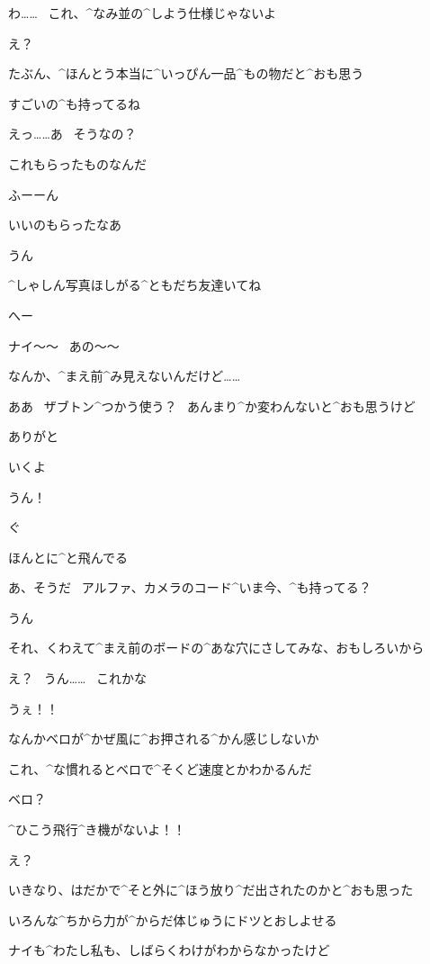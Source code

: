 \Nai わ……
\ これ、^{なみ}{並}の^{しよう}{仕様}じゃないよ

\Alpha え？

\Nai たぶん、^{ほんとう}{本当}に^{いっぴん}{一品}^{もの}{物}だと^{おも}{思}う

\Nai すごいの^{も}{持}ってるね

\page[63]
\Alpha えっ……あ
\ そうなの？

\Alpha これもらったものなんだ

\Nai ふーーん

\Nai いいのもらったなあ

\Alpha うん

\Nai ^{しゃしん}{写真}ほしがる^{ともだち}{友達}いてね

\Alpha へー

\page[64]
\Alpha ナイ〜〜
\ あの〜〜

\Alpha なんか、^{まえ}{前}^{み}{見}えないんだけど……

\Nai ああ
\ ザブトン^{つかう}{使う}？
\ あんまり^{か}{変}わんないと^{おも}{思}うけど

\Alpha ありがと

\page[65]
\Nai いくよ

\Alpha うん！

\page[66]
\Alpha ぐ

\page[68]
\Alpha ほんとに^{と}{飛}んでる

\page[69]
\Nai あ、そうだ
\ アルファ、カメラのコード^{いま}{今}、^{も}{持}ってる？

\Alpha うん

\Nai それ、くわえて^{まえ}{前}のボードの^{あな}{穴}にさしてみな、おもしろいから

\Alpha え？
\ うん……
\ これかな

\Alpha うぇ！！

\Nai なんかベロが^{かぜ}{風}に^{お}{押}される^{かん}{感}じしないか

\Nai これ、^{な}{慣}れるとベロで^{そくど}{速度}とかわかるんだ

\Alpha ベロ？

\page[71]
\Alpha ^{ひこう}{飛行}^{き}{機}がないよ！！

\Nai え？

\page[72]
\Alpha いきなり、はだかで^{そと}{外}に^{ほう}{放}り^{だ}{出}されたのかと^{おも}{思}った

\Alpha いろんな^{ちから}{力}が^{からだ}{体}じゅうにドツとおしよせる

\Alpha ナイも^{わたし}{私}も、しばらくわけがわからなかったけど

